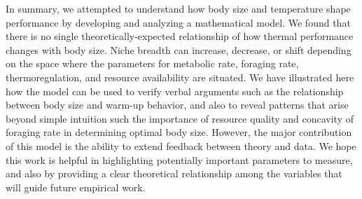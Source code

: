 In summary, we attempted to understand how body size and temperature shape performance by developing and analyzing a mathematical model.
We found that there is no single theoretically-expected relationship of how thermal performance changes with body size.
Niche breadth can increase, decrease, or shift depending on the space where the parameters for metabolic rate, foraging rate, thermoregulation, and resource availability are situated.
We have illustrated here how the model can be used to verify verbal arguments such as the relationship between body size and warm-up behavior, and also to reveal patterns that arise beyond simple intuition such the importance of resource quality and concavity of foraging rate in determining optimal body size. %
However, the major contribution of this model is the ability to extend feedback between theory and data.
We hope this work is helpful in highlighting potentially important parameters to measure, and also by providing a clear theoretical relationship among the variables that will guide future empirical work.




